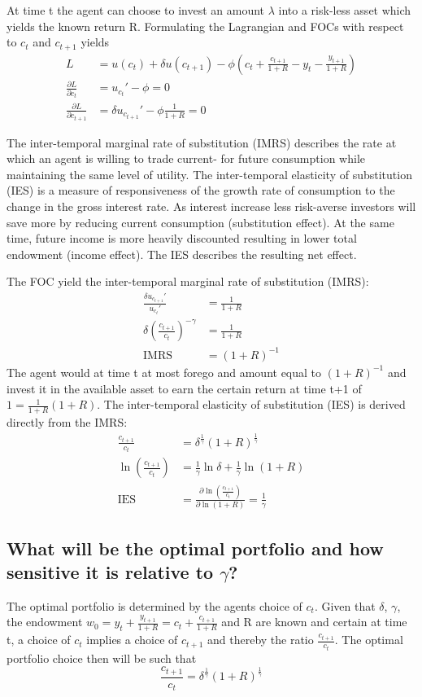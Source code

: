 \documentclass[12pt]{article}
\begin{document}
	At time t the agent can choose to invest an amount $\lambda$ into a risk-less asset which yields the known return R. Formulating the Lagrangian and FOCs with respect to $c_t$ and $c_{t+1}$ yields
	\begin{align*}
		L &= u(c_t) + \delta u(c_{t+1}) - \phi \left(c_t + \frac{c_{t+1}}{1+R} - y_t - \frac{y_{t+1}}{1+R}\right)\\
		\frac{\partial L}{\partial c_t} &= u_{c_t}' - \phi = 0\\
		\frac{\partial L}{\partial c_{t+1}} &= \delta u_{c_{t+1}}' - \phi \frac{1}{1+R}= 0
	\end{align*}
	
	The inter-temporal marginal rate of substitution (IMRS) describes the rate at which an agent is willing to trade current- for future consumption while maintaining the same level of utility. The inter-temporal elasticity of substitution (IES) is a measure of responsiveness of the growth rate of consumption to the change in the gross interest rate. As interest increase less risk-averse investors will save more by reducing current consumption (substitution effect). At the same time, future income is more heavily discounted resulting in lower total endowment (income effect). The IES describes the resulting net effect.
	
	The FOC yield the inter-temporal marginal rate of substitution (IMRS):
	\begin{align*}
		\frac{\delta u_{c_{t+1}}'}{u_{c_t}'} &= \frac{1}{1+R}\\
		\delta \left( \frac{c_{t+1}}{c_t} \right)^{-\gamma} &= \frac{1}{1+R}\\
		\text{IMRS} &= (1+R)^{-1}
	\end{align*}
	The agent would at time t at most forego and amount equal to $(1+R)^{-1}$ and invest it in the available asset to earn the certain return at time t+1 of $1 = \frac{1}{1+R}(1+R)$. The inter-temporal elasticity of substitution (IES) is derived directly from the IMRS:
	\begin{align*}
		\frac{c_{t+1}}{c_t} &= \delta^{\frac{1}{\gamma}}(1+R)^{\frac{1}{\gamma}}\\
		\ln \left(\frac{c_{t+1}}{c_t}\right) &= \frac{1}{\gamma} \ln \delta + \frac{1}{\gamma} \ln (1+R)\\
		\text{IES} &= \frac{\partial \ln (\frac{c_{t+1}}{c_t})}{\partial\ln (1+R)} = \frac{1}{\gamma}
	\end{align*}
	
	\subsection{What will be the optimal portfolio and how sensitive it is relative to $\gamma$?}
	The optimal portfolio is determined by the agents choice of $c_t$. Given that $\delta$, $\gamma$, the endowment $w_0 = y_t + \frac{y_{t+1}}{1+R} = c_t + \frac{c_{t+1}}{1+R}$ and R are known and certain at time t, a choice of $c_t$ implies a choice of $c_{t+1}$ and thereby the ratio $\frac{c_{t+1}}{c_t}$. The optimal portfolio choice then will be such that $$\frac{c_{t+1}}{c_t} = \delta^{\frac{1}{\gamma}}(1+R)^{\frac{1}{\gamma}}$$
	
\end{document}
